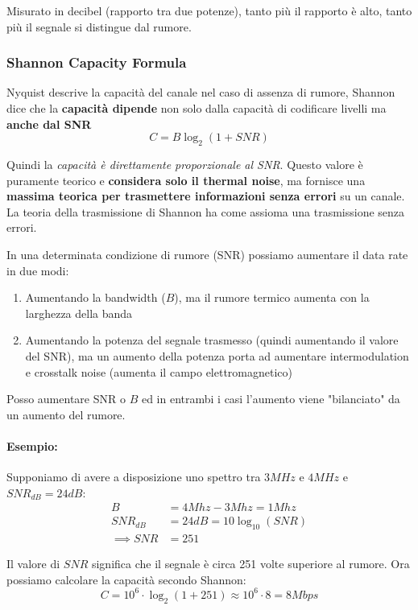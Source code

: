 Misurato in decibel (rapporto tra due potenze), tanto più il rapporto è alto, tanto più il segnale si distingue dal rumore.

\subsubsection{Shannon Capacity Formula}
Nyquist descrive la capacità del canale nel caso di assenza di rumore, Shannon dice che la \textbf{capacità dipende} non solo dalla capacità di codificare livelli ma \textbf{anche dal SNR}
$$ C = B \log_2 (1 + SNR) $$

Quindi la \textit{capacità è direttamente proporzionale al SNR}. Questo valore è puramente teorico e \textbf{considera solo il thermal noise}, ma fornisce una \textbf{massima teorica per trasmettere informazioni senza errori} su un canale. La teoria della trasmissione di Shannon ha come assioma una trasmissione senza errori.

In una determinata condizione di rumore (SNR) possiamo aumentare il data rate in due modi:
\begin{enumerate}
	\item Aumentando la bandwidth ($B$), ma il rumore termico aumenta con la larghezza della banda
	
    \item Aumentando la potenza del segnale trasmesso (quindi aumentando il valore del SNR), ma un aumento della potenza porta ad aumentare intermodulation e crosstalk noise (aumenta il campo elettromagnetico)
\end{enumerate}

Posso aumentare SNR o $B$ ed in entrambi i casi l'aumento viene "bilanciato" da un aumento del rumore.

\paragraph{Esempio:} Supponiamo di avere a disposizione uno spettro tra $3 MHz$ e $4 MHz$ e $SNR_{dB}=24dB$:
\begin{align*}
	B & = 4Mhz - 3Mhz = 1 Mhz \\
	SNR_{dB} & = 24dB = 10 \log_{10} (SNR) \\
	\implies SNR & = 251
\end{align*}

Il valore di $SNR$ significa che il segnale è circa 251 volte superiore al rumore. Ora possiamo calcolare la capacità secondo Shannon:
$$ C = 10^6 \cdot \log_2 (1 + 251) \approx 10^6 \cdot 8 = 8 Mbps $$

